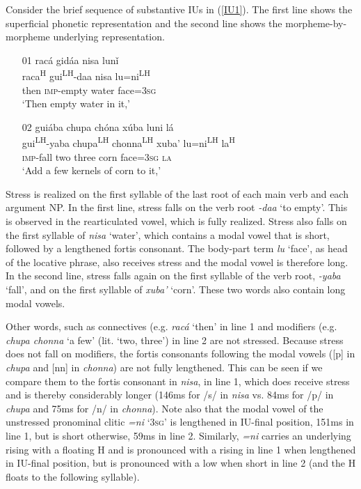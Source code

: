 Consider the brief sequence of substantive IUs in (\ref{IU1}). The first line shows the superficial phonetic representation and the second line shows the morpheme-by-morpheme underlying representation.


\ea\label{IU1}
\begin{itemize}
\item[01]
\glll racá gidáa nisa lun\v{i} \\
raca\textsuperscript{H} gui\textsuperscript{LH}-daa nisa lu=ni\textsuperscript{LH}	\\
then \textsc{imp}-empty water face=\textsc{3sg} \\
\glt `Then empty water in it,'



\item[02]
\glll guiába chupa ch\'{o}na x\'{u}ba luni lá \\
gui\textsuperscript{LH}-yaba chupa\textsuperscript{LH} chonna\textsuperscript{LH} xuba' lu=ni\textsuperscript{LH} la\textsuperscript{H}	\\
\textsc{imp}-fall two three corn face=\textsc{3sg} \textsc{la} \\
\glt `Add a few kernels of corn to it,'

\end{itemize}
\z

Stress is realized on the first syllable of the last root of each main verb and each argument NP. In the first line, stress falls on the verb root \textit{-daa} `to empty'. This is observed in the rearticulated vowel, which is fully realized. Stress also falls on the first syllable of \textit{nisa} `water', which contains a modal vowel that is short, followed by a lengthened fortis consonant. The body-part term \textit{lu} `face', as head of the locative phrase, also receives stress and the modal vowel is therefore long. In the second line, stress falls again on the first syllable of the verb root, \textit{-yaba} `fall', and on the first syllable of \textit{xuba'} `corn'. These two words also contain long modal vowels. 

Other words, such as connectives (e.g. \textit{racá} `then' in line 1 and modifiers (e.g. \textit{chupa chonna} `a few' (lit. `two, three') in line 2 are not stressed. Because stress does not fall on modifiers, the fortis consonants following the modal vowels ([p] in \textit{chupa} and [nn] in \textit{chonna}) are not fully lengthened. This can be seen if we compare them to the fortis consonant in \textit{nisa}, in line 1, which does receive stress and is thereby considerably longer (146ms for /s/ in \textit{nisa} vs. 84ms for /p/ in \textit{chupa} and 75ms for /n/ in \textit{chonna}). Note also that the modal vowel of the unstressed pronominal clitic \textit{=ni} `3\textsc{sg}' is lengthened in IU-final position, 151ms in line 1, but is short otherwise, 59ms in line 2. Similarly, \textit{=ni}  carries an underlying rising  with a floating H and is pronounced with a rising  in line 1 when lengthened in IU-final position, but is pronounced with a low  when short in line 2 (and the H  floats to the following syllable).

